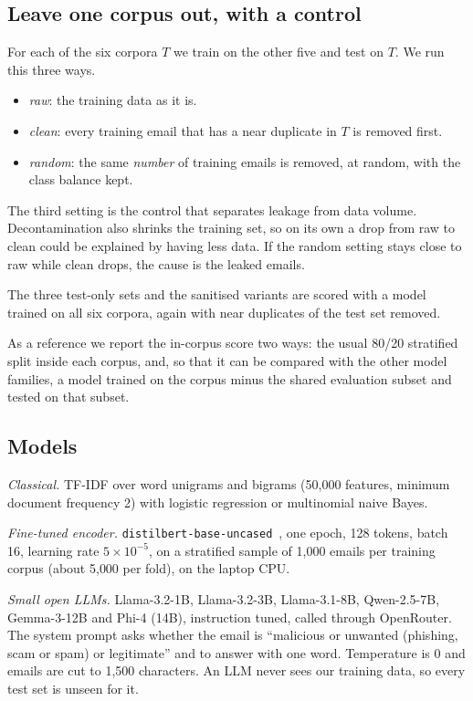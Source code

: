 \subsection{Leave one corpus out, with a control}

For each of the six corpora $T$ we train on the other five and test on $T$. We
run this three ways.
\begin{itemize}
\item \textit{raw}: the training data as it is.
\item \textit{clean}: every training email that has a near duplicate in $T$ is
removed first.
\item \textit{random}: the same \emph{number} of training emails is removed, at
random, with the class balance kept.
\end{itemize}
The third setting is the control that separates leakage from data volume.
Decontamination also shrinks the training set, so on its own a drop from raw to
clean could be explained by having less data. If the random setting stays close
to raw while clean drops, the cause is the leaked emails.

The three test-only sets and the sanitised variants are scored with a model
trained on all six corpora, again with near duplicates of the test set removed.

As a reference we report the in-corpus score two ways: the usual 80/20
stratified split inside each corpus, and, so that it can be compared with the
other model families, a model trained on the corpus minus the shared
evaluation subset and tested on that subset.

\subsection{Models}

\textit{Classical.} TF-IDF over word unigrams and bigrams (50{,}000 features,
minimum document frequency 2) with logistic regression or multinomial naive
Bayes.

\textit{Fine-tuned encoder.} \texttt{distilbert-base-uncased}~\cite{distilbert},
one epoch, 128 tokens, batch 16, learning rate $5\times10^{-5}$, on a
stratified sample of 1{,}000 emails per training corpus (about 5{,}000 per
fold), on the laptop CPU.

\textit{Small open LLMs.} Llama-3.2-1B, Llama-3.2-3B, Llama-3.1-8B,
Qwen-2.5-7B, Gemma-3-12B and Phi-4 (14B), instruction tuned, called through
OpenRouter. The system prompt asks whether the email is ``malicious or
unwanted (phishing, scam or spam) or legitimate'' and to answer with one word.
Temperature is 0 and emails are cut to 1{,}500 characters. An LLM never sees
our training data, so every test set is unseen for it.

